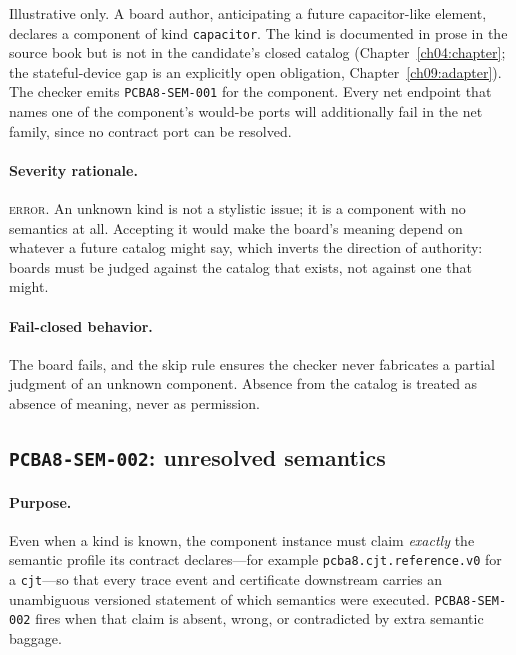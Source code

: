 \begin{example}\label{ch07:ex:sem001}
Illustrative only. A board author, anticipating a future capacitor-like element, declares a component of kind \texttt{capacitor}. The kind is documented in prose in the source book but is not in the candidate's closed catalog (Chapter~\ref{ch04:chapter}; the stateful-device gap is an explicitly open obligation, Chapter~\ref{ch09:adapter}). The checker emits \texttt{PCBA8-SEM-001} for the component. Every net endpoint that names one of the component's would-be ports will additionally fail in the net family, since no contract port can be resolved.
\end{example}

\paragraph{Severity rationale.} \textsc{error}. An unknown kind is not a stylistic issue; it is a component with no semantics at all. Accepting it would make the board's meaning depend on whatever a future catalog might say, which inverts the direction of authority: boards must be judged against the catalog that exists, not against one that might.

\paragraph{Fail-closed behavior.} The board fails, and the skip rule ensures the checker never fabricates a partial judgment of an unknown component. Absence from the catalog is treated as absence of meaning, never as permission.

\subsection{\texttt{PCBA8-SEM-002}: unresolved semantics}\label{ch07:sub:sem002}

\paragraph{Purpose.} Even when a kind is known, the component instance must claim \emph{exactly} the semantic profile its contract declares---for example \texttt{pcba8.cjt.reference.v0} for a \texttt{cjt}---so that every trace event and certificate downstream carries an unambiguous versioned statement of which semantics were executed. \texttt{PCBA8-SEM-002} fires when that claim is absent, wrong, or contradicted by extra semantic baggage.

